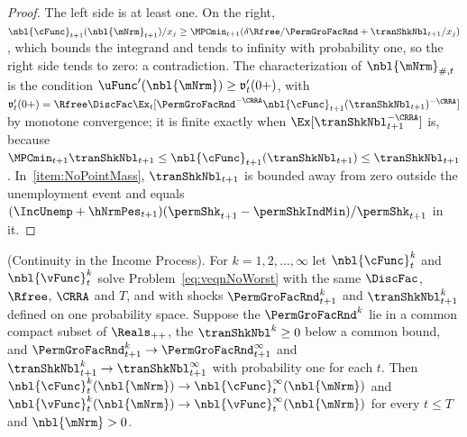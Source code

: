 \documentclass[\econtexRoot/BufferStockTheory]{subfiles}
\begin{document}
\begin{proof}
The left side is at least one.
On the right, $\nbl{\cFunc}_{t+1}(\nbl{\mNrm}_{t+1})/x_{j}\geq\MPCmin_{t+1}(\delta\Rfree/\PermGroFacRnd+\tranShkNbl_{t+1}/x_{j})$, which bounds the integrand and tends to infinity with probability one, so the right side tends to zero: a contradiction.
The characterization of $\nbl{\mNrm}_{\#,t}$ is the condition $\uFunc^{\prime}(\nbl{\mNrm})\geq\mathfrak{v}_{t}^{\prime}(0+)$, with $\mathfrak{v}_{t}^{\prime}(0+)=\Rfree\DiscFac\Ex_{t}[\PermGroFacRnd^{-\CRRA}\nbl{\cFunc}_{t+1}(\tranShkNbl_{t+1})^{-\CRRA}]$ by monotone convergence; it is finite exactly when $\Ex[\tranShkNbl_{t+1}^{-\CRRA}]$ is, because $\MPCmin_{t+1}\tranShkNbl_{t+1}\leq\nbl{\cFunc}_{t+1}(\tranShkNbl_{t+1})\leq\tranShkNbl_{t+1}$.
In~\ref{item:NoPointMass}, $\tranShkNbl_{t+1}$ is bounded away from zero outside the unemployment event and equals $(\IncUnemp+\hNrmPes_{t+1})(\permShk_{t+1}-\permShkIndMin)/\permShk_{t+1}$ in it.
\end{proof}

\begin{lemma}(Continuity in the Income Process).\label{lemma:ContinuityIncome}
For $k=1,2,\ldots,\infty$ let $\nbl{\cFunc}_{t}^{k}$ and $\nbl{\vFunc}_{t}^{k}$ solve Problem~\eqref{eq:veqnNoWorst} with the same $\DiscFac$, $\Rfree$, $\CRRA$ and $T$, and with shocks $\PermGroFacRnd_{t+1}^{k}$ and $\tranShkNbl_{t+1}^{k}$ defined on one probability space.
Suppose the $\PermGroFacRnd^{k}$ lie in a common compact subset of $\Reals_{++}$, the $\tranShkNbl^{k}\geq 0$ below a common bound, and $\PermGroFacRnd_{t+1}^{k}\rightarrow\PermGroFacRnd_{t+1}^{\infty}$ and $\tranShkNbl_{t+1}^{k}\rightarrow\tranShkNbl_{t+1}^{\infty}$ with probability one for each $t$.
Then $\nbl{\cFunc}_{t}^{k}(\nbl{\mNrm})\rightarrow\nbl{\cFunc}_{t}^{\infty}(\nbl{\mNrm})$ and $\nbl{\vFunc}_{t}^{k}(\nbl{\mNrm})\rightarrow\nbl{\vFunc}_{t}^{\infty}(\nbl{\mNrm})$ for every $t\leq T$ and $\nbl{\mNrm}>0$.
\end{lemma}
\end{document}

